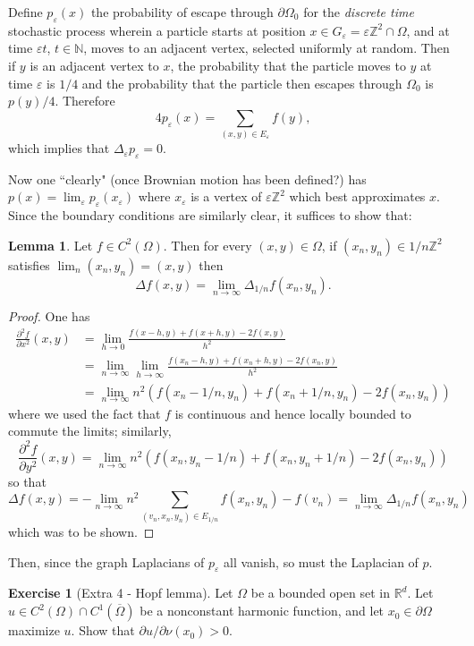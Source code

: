 \documentclass[10pt]{article}
\newcommand{\NN}{\mathbb{N}}
\newcommand{\ZZ}{\mathbb{Z}}
\newcommand{\RR}{\mathbb{R}}
\theoremstyle{definition}
\newtheorem{exer}{Exercise}
\newtheorem{lemma}{Lemma}[exer]
\begin{document}
Define $p_\varepsilon(x)$ the probability of escape through $\partial \Omega_0$ for the \emph{discrete time} stochastic process wherein a particle starts at position $x \in G_\varepsilon = \varepsilon \ZZ^2 \cap \Omega$, and at time $\varepsilon t$, $t \in \NN$, moves to an adjacent vertex, selected uniformly at random.
Then if $y$ is an adjacent vertex to $x$, the probability that the particle moves to $y$ at time $\varepsilon$ is $1/4$ and the probability that the particle then escapes through $\Omega_0$ is $p(y)/4$. Therefore
$$4p_\varepsilon(x) = \sum_{(x, y) \in E_\varepsilon} f(y),$$
which implies that $\Delta_\varepsilon p_\varepsilon = 0$.

Now one ``clearly" (once Brownian motion has been defined?) has $p(x) = \lim_\varepsilon p_\varepsilon(x_\varepsilon)$ where $x_\varepsilon$ is a vertex of $\varepsilon \ZZ^2$ which best approximates $x$. Since the boundary conditions are similarly clear, it suffices to show that:

\begin{lemma}
Let $f \in C^2(\Omega)$. Then for every $(x, y) \in \Omega$, if $(x_n, y_n) \in 1/n \ZZ^2$ satisfies $\lim_n (x_n, y_n) = (x,y)$ then
$$\Delta f(x, y) = \lim_{n \to \infty} \Delta_{1/n} f(x_n, y_n).$$
\end{lemma}
\begin{proof}
One has
\begin{align*}
\frac{\partial^2 f}{\partial x^2} (x, y) &= \lim_{h \to 0} \frac{f(x - h, y) + f(x + h, y) - 2f(x, y)}{h^2}\\
&= \lim_{n \to \infty} \lim_{h \to \infty} \frac{f(x_n - h, y) + f(x_n + h, y) - 2f(x_n, y)}{h^2}\\
&= \lim_{n \to \infty} n^2(f(x_n - 1/n, y_n) + f(x_n + 1/n, y_n) - 2f(x_n, y_n))
\end{align*}
where we used the fact that $f$ is continuous and hence locally bounded to commute the limits; similarly,
$$\frac{\partial^2 f}{\partial y^2} (x, y) = \lim_{n \to \infty} n^2(f(x_n, y_n - 1/n) + f(x_n, y_n + 1/n) - 2f(x_n, y_n))$$
so that
$$\Delta f(x, y) = -\lim_{n \to \infty} n^2 \sum_{(v_n, x_n, y_n) \in E_{1/n}} f(x_n, y_n) - f(v_n) = \lim_{n \to \infty} \Delta_{1/n} f(x_n, y_n)$$
which was to be shown.
\end{proof}

Then, since the graph Laplacians of $p_\varepsilon$ all vanish, so must the Laplacian of $p$.

\begin{exer}[Extra 4 - Hopf lemma]
Let $\Omega$ be a bounded open set in $\RR^d$.
Let $u \in C^2(\Omega) \cap C^1(\overline \Omega)$ be a nonconstant harmonic function, and let $x_0 \in \partial \Omega$ maximize $u$.
Show that $\partial u/\partial \nu (x_0) > 0$.
\end{exer}
\end{document}
